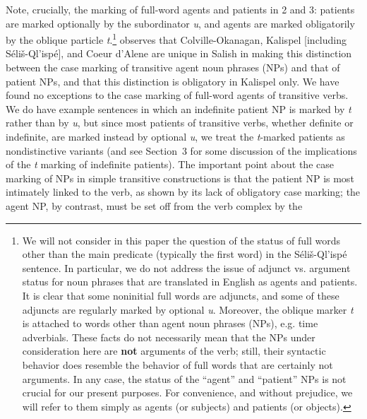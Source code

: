 \documentclass[output=paper,colorlinks,citecolor=brown]{langscibook}
\begin{document}
  Note, crucially, the marking of full-word agents and patients in 2
  and 3: patients are marked optionally by the subordinator
  \emph{{\textltilde}u}, and agents are marked obligatorily by the
  oblique particle \emph{t}.\footnote{We will not consider in this
  paper the question of the status of full words other than the main
  predicate (typically the first word) in the S\'eli\v{s}-Ql'isp\'e
  sentence.  In particular, we do not address the issue of adjunct
  vs. argument status for noun phrases that are translated in English
  as agents and patients.  It is clear that some noninitial full
  words are adjuncts, and some of these adjuncts are regularly marked
  by optional \emph{{\textltilde}u}.  Moreover, the oblique marker
  \emph{t} is attached to words other than agent noun phrases (NPs),
  e.g.  time adverbials.  These facts do not necessarily mean that
  the NPs under consideration here are \textbf{not} arguments of the
  verb; still, their syntactic behavior does resemble the behavior of
  full words that are certainly not arguments.  In any case, the
  status of the ``agent'' and ``patient'' NPs is not crucial for our
  present purposes.  For convenience, and without prejudice, we will
  refer to them simply as agents (or subjects) and patients (or
  objects).  } \cite[52--53]{Kroeber:1999} observes that Colville-Okanagan,
  Kalispel [including S\'eli\v{s}-Ql'isp\'e], and Coeur d'Alene are
  unique in Salish in making this distinction between the case
  marking of transitive agent noun phrases (NPs) and that of patient
  NPs, and that this distinction is obligatory in Kalispel only.  We
  have found no exceptions to the case marking of full-word agents of
  transitive verbs.  We do have example sentences in which an
  indefinite patient NP is marked by \emph{t} rather than by \emph{{\textltilde}u}, but since most patients of transitive verbs,
  whether definite or indefinite, are marked instead by optional \emph{{\textltilde}u}, we treat the \emph{t}-marked patients as
  nondistinctive variants (and see Section~3 for some discussion of the
  implications of the \emph{t} marking of indefinite patients).  The
  important point about the case marking of NPs in simple transitive
  constructions is that the patient NP is most intimately linked to
  the verb, as shown by its lack of obligatory case marking; the
  agent NP, by contrast, must be set off from the verb complex by the
\end{document}
